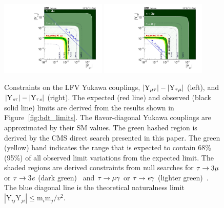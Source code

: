 \begin{figure}[htbp!]
  \centering
  \includegraphics[width=0.45\textwidth]{plots/chapter9/limits/Ymt.pdf}
  \includegraphics[width=0.45\textwidth]{plots/chapter9/limits/Yet.pdf} \\
  \caption{Constraints on the LFV Yukawa couplings, $|\text{Y}_{\mu\tau}|-|\text{Y}_{\tau\mu}|$ (left), and $|\text{Y}_{\textit{e}\tau}|-|\text{Y}_{\tau\textit{e}}|$ (right). The expected (red line) and observed (black solid line) limits are derived from the results shown in Figure~\ref{fig:bdt_limits}. The flavor-diagonal Yukawa couplings are approximated by their SM values. The green hashed region is derived by the CMS direct search presented in this paper. The green (yellow) band indicates the range that is expected to contain 68\% (95\%) of all observed limit variations from the expected limit. The shaded regions are derived constraints from null searches for $\tau\to3\mu$ or $\tau\to3\textit{e}$ (dark green)~\cite{Hayasaka:2010np} and $\tau\to\mu\gamma$ or $\tau\to\textit{e}\gamma$ (lighter green)~\cite{Harnik:2012pb}. The blue diagonal line is the theoretical naturalness limit $|\text{Y}_{ij}\text{Y}_{ji}|\leq{\text{m}_i}\text{m}_j/v^2$.}
  \label{fig:bdt_yukawa_limits}
\end{figure}






